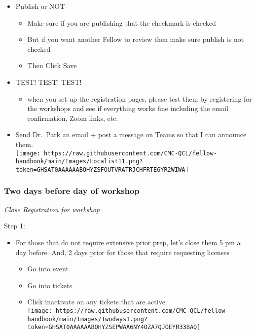 \documentclass[
]{book}
\providecommand{\tightlist}{%
  \setlength{\itemsep}{0pt}\setlength{\parskip}{0pt}}
\begin{document}
\begin{itemize}
\tightlist
\item
  Publish or NOT

  \begin{itemize}
  \tightlist
  \item
    Make sure if you are publishing that the checkmark is checked\\
  \item
    But if you want another Fellow to review then make sure publish is not checked\\
  \item
    Then Click Save\\
  \end{itemize}
\item
  TEST! TEST! TEST!

  \begin{itemize}
  \tightlist
  \item
    when you set up the registration pages, please test them by registering for the workshops and see if everything works fine including the email confirmation, Zoom links, etc.\\
  \end{itemize}
\item
  Send Dr.~Park an email + post a message on Teams so that I can announce them.\\
  \texttt{[image: https://raw.githubusercontent.com/CMC-QCL/fellow-handbook/main/Images/Localist11.png?token=GHSAT0AAAAAABQHYZSFOUTVRATRJCHFRTE6YR2WIWA]}
\end{itemize}

\hypertarget{two-days-before-day-of-workshop}{%
\subsubsection{\texorpdfstring{Two days before day of workshop }{Two days before day of workshop }}\label{two-days-before-day-of-workshop}}

\emph{Close Registration for workshop}

Step 1:

\begin{itemize}
\tightlist
\item
  For those that do not require extensive prior prep, let's close them 5 pm a day before. And, 2 days prior for those that require requesting licenses

  \begin{itemize}
  \tightlist
  \item
    Go into event\\
  \item
    Go into tickets\\
  \item
    Click inactivate on any tickets that are active\\
    \texttt{[image: https://raw.githubusercontent.com/CMC-QCL/fellow-handbook/main/Images/Twodays1.png?token=GHSAT0AAAAAABQHYZSEPWAA6NY4OZA7QJOEYR33BAQ]}
  \end{itemize}
\end{itemize}
\end{document}
